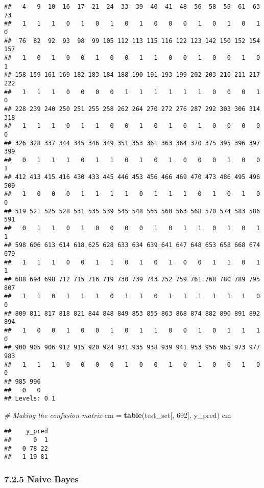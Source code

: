 \documentclass[]{article}
\newenvironment{Shaded}{\begin{snugshade}}{\end{snugshade}}
\newcommand{\CommentTok}[1]{\textcolor[rgb]{0.56,0.35,0.01}{\textit{#1}}}
\newcommand{\DecValTok}[1]{\textcolor[rgb]{0.00,0.00,0.81}{#1}}
\newcommand{\KeywordTok}[1]{\textcolor[rgb]{0.13,0.29,0.53}{\textbf{#1}}}
\newcommand{\NormalTok}[1]{#1}
\newcommand{\StringTok}[1]{\textcolor[rgb]{0.31,0.60,0.02}{#1}}
\begin{document}
\begin{verbatim}
##   4   9  10  16  17  21  24  33  39  40  41  48  56  58  59  61  63  73 
##   1   1   1   0   1   0   1   0   1   0   0   0   1   0   1   0   1   0 
##  76  82  92  93  98  99 105 112 113 115 116 122 123 142 150 152 154 157 
##   1   0   1   0   0   1   0   0   1   1   0   0   1   0   0   1   0   1 
## 158 159 161 169 182 183 184 188 190 191 193 199 202 203 210 211 217 222 
##   1   1   1   0   0   0   0   1   1   1   1   1   1   0   0   0   1   0 
## 228 239 240 250 251 255 258 262 264 270 272 276 287 292 303 306 314 318 
##   1   1   1   0   1   1   0   0   1   0   1   0   1   0   0   0   0   0 
## 326 328 337 344 345 346 349 351 353 361 363 364 370 375 395 396 397 399 
##   0   1   1   1   0   1   1   0   1   0   1   0   0   0   1   0   0   1 
## 412 413 415 416 430 433 445 446 453 456 466 469 470 473 486 495 496 509 
##   1   0   0   0   1   1   1   1   0   1   1   1   0   1   0   1   0   0 
## 519 521 525 528 531 535 539 545 548 555 560 563 568 570 574 583 586 591 
##   0   1   1   0   1   0   0   0   0   1   0   1   1   0   1   0   1   1 
## 598 606 613 614 618 625 628 633 634 639 641 647 648 653 658 668 674 679 
##   1   1   1   0   0   1   1   0   1   0   1   0   0   1   1   0   1   1 
## 688 694 698 712 715 716 719 730 739 743 752 759 761 768 780 789 795 807 
##   1   1   0   1   1   1   0   1   1   0   1   1   1   1   1   1   0   0 
## 809 811 817 818 821 844 848 849 853 855 863 868 874 882 890 891 892 894 
##   1   0   0   1   0   0   1   0   1   1   0   0   1   0   1   1   1   0 
## 900 905 906 912 915 920 924 931 935 938 939 941 953 956 965 973 977 983 
##   1   1   1   0   0   0   0   1   0   0   1   0   1   0   0   1   0   0 
## 985 996 
##   0   0 
## Levels: 0 1
\end{verbatim}

\begin{Shaded}
\begin{Highlighting}[]
\CommentTok{# Making the confusion matrix}
\NormalTok{cm =}\StringTok{ }\KeywordTok{table}\NormalTok{(test_set[, }\DecValTok{692}\NormalTok{], y_pred)}
\NormalTok{cm}
\end{Highlighting}
\end{Shaded}

\begin{verbatim}
##    y_pred
##      0  1
##   0 78 22
##   1 19 81
\end{verbatim}

\hypertarget{naive-bayes}{%
\subsubsection{7.2.5 Naive Bayes}\label{naive-bayes}}
\end{document}
